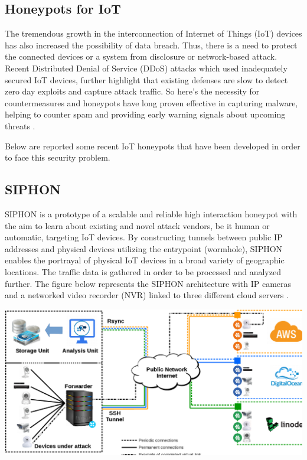 \documentclass[epsfig,a4paper,11pt,titlepage,oneside,openany]{book}
\begin{document}
\begin{itemize}
\chapter{Honeypots for IoT}
The tremendous growth in the interconnection of Internet of Things (IoT) devices has also increased the possibility of data breach. Thus, there is a need to protect the connected devices or a system from disclosure or network-based attack. Recent Distributed Denial of Service (DDoS) attacks which used inadequately secured IoT devices, further highlight that existing defenses are slow to detect zero day exploits and capture attack traffic. So here’s the necessity for countermeasures and honeypots have long proven effective in capturing malware, helping to counter spam and providing early warning signals about upcoming threats \cite{review}.

Below are reported some recent IoT honeypots that have been developed in order to face this security problem.

\section{SIPHON}

SIPHON is a prototype of a scalable and reliable high interaction honeypot with the aim to learn about existing and novel attack vendors, be it human or automatic, targeting IoT devices. By constructing tunnels between public IP addresses and physical devices utilizing the entrypoint (wormhole), SIPHON enables the portrayal of physical IoT devices in a broad variety of geographic locations. The traffic data is gathered in order to be processed and analyzed further. The figure below represents the SIPHON architecture with IP cameras and a networked video recorder (NVR) linked to three different cloud servers \cite{guarnizo2017siphon}.
\begin{center}
\includegraphics[scale=0.25]{SIPHON}
\end{center}


\end{itemize}
\end{document}
